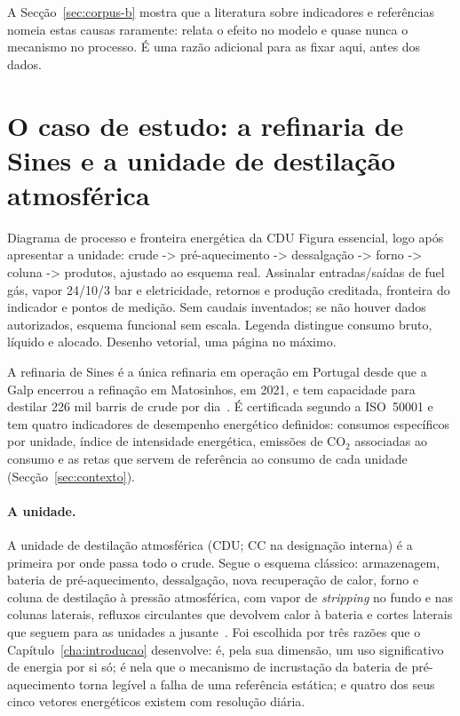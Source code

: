 A Secção~\ref{sec:corpus-b} mostra que a literatura sobre indicadores e
referências nomeia estas causas raramente: relata o efeito no modelo e
quase nunca o mecanismo no processo. É uma razão adicional para as fixar
aqui, antes dos dados.

\section{O caso de estudo: a refinaria de Sines e a unidade de destilação atmosférica}
\label{sec:caso-estudo}
{Diagrama de processo e fronteira energética da CDU}
{Figura essencial, logo após apresentar a unidade: crude -\textgreater{} pré-aquecimento
-\textgreater{} dessalgação -\textgreater{} forno -\textgreater{} coluna -\textgreater{} produtos, ajustado ao esquema real.
Assinalar entradas/saídas de fuel gás, vapor 24/10/3 bar e eletricidade,
retornos e produção creditada, fronteira do indicador e pontos de medição.
Sem caudais inventados; se não houver dados autorizados, esquema funcional
sem escala. Legenda distingue consumo bruto, líquido e alocado. Desenho
vetorial, uma página no máximo.}%

A refinaria de Sines é a única refinaria em operação em Portugal desde que a
Galp encerrou a refinação em Matosinhos, em 2021, e tem capacidade para
destilar 226 mil barris de crude por dia~\cite{Galp2026Industrial}. É certificada
segundo a ISO~50001 e tem quatro indicadores de desempenho energético
definidos: consumos específicos por unidade, índice de intensidade
energética, emissões de CO$_2$ associadas ao consumo e as retas que servem
de referência ao consumo de cada unidade (Secção~\ref{sec:contexto}).

\paragraph{A unidade.} A unidade de destilação atmosférica (CDU; CC na
designação interna) é a primeira por onde passa todo o crude. Segue o
esquema clássico: armazenagem, bateria de pré-aquecimento, dessalgação,
nova recuperação de calor, forno e coluna de destilação à pressão
atmosférica, com vapor de \emph{stripping} no fundo e nas colunas laterais,
refluxos circulantes que devolvem calor à bateria e cortes laterais que
seguem para as unidades a jusante~\cite{Gary2007}. Foi escolhida por três
razões que o Capítulo~\ref{cha:introducao} desenvolve: é, pela sua dimensão,
um uso significativo de energia por si só; é nela que o mecanismo de
incrustação da bateria de pré-aquecimento torna legível a falha de uma
referência estática; e quatro dos seus cinco vetores energéticos existem
com resolução diária.

